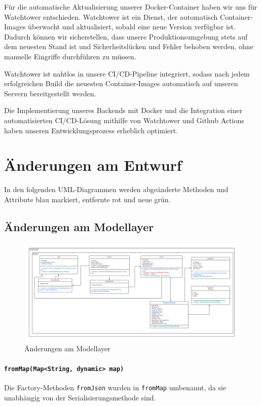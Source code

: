 \documentclass{implementierungsheft}
\begin{document}
Für die automatische Aktualisierung unserer Docker-Container haben wir uns für Watchtower entschieden. Watchtower ist ein Dienst, der automatisch Container-Images überwacht und aktualisiert, sobald eine neue Version verfügbar ist. Dadurch können wir sicherstellen, dass unsere Produktionsumgebung stets auf dem neuesten Stand ist und Sicherheitslücken und Fehler behoben werden, ohne manuelle Eingriffe durchführen zu müssen.

Watchtower ist nahtlos in unsere CI/CD-Pipeline integriert, sodass nach jedem erfolgreichen Build die neuesten Container-Images automatisch auf unseren Servern bereitgestellt werden.

Die Implementierung unseres Backends mit Docker und die Integration einer automatisierten CI/CD-Lösung mithilfe von Watchtower und Github Actions haben unseren Entwicklungsprozess erheblich optimiert.
\newpage
\section{Änderungen am Entwurf} \label{sec:changes}
In den folgenden UML-Diagrammen werden abgeänderte Methoden und Attribute blau markiert, entfernte rot und neue grün.
\subsection{Änderungen am Modellayer}
\begin{figure}[htp]
    \centering
    \includegraphics[width=\textwidth]{images/uml/modelLayer.pdf}
    \caption{Änderungen am Modellayer}
    \label{fig:modellayer}
\end{figure}
\paragraph*{\texttt{fromMap(Map<String, dynamic> map)}} Die Factory-Methoden \texttt{fromJson} wurden in \texttt{fromMap} umbenannt, da sie unabhängig von der Serialisierungsmethode sind.
\end{document}
